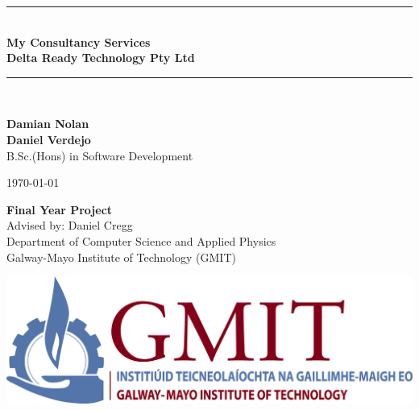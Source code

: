 \documentclass[12pt,a4paper,oneside,openany]{book}
\newcommand{\projecttitle}{My Consultancy Services}
\newcommand{\industrypartner}{Delta Ready Technology Pty Ltd}
\newcommand{\projectauthor}{Damian Nolan \\[0.2cm] Daniel Verdejo}
\newcommand{\projectadvisor}{Daniel Cregg}
\newcommand{\projectprogramme}{B.Sc.(Hons) in Software Development}
\newcommand{\projectdate}{\today}
\begin{document}
  \begin{titlepage}
    \begin{minipage}[t][6cm]{\textwidth}
      \centering
      \rule{\linewidth}{0.5mm} \\[0.4cm]
      { \LARGE \bfseries \projecttitle \\[0.4cm] }
      { \bfseries \industrypartner \\[0.4cm]}
      \rule{\linewidth}{0.5mm} \\[0.8cm]
    \end{minipage}
    
    \begin{minipage}[t][6.5cm]{\textwidth}
      \centering
      \textbf{\projectauthor}\\[0.5cm]
      \projectprogramme
    \end{minipage}
  
    \begin{minipage}[t][1cm]{\textwidth}
      \centering
      \textsc{\projectdate}
    \end{minipage}
      
    \begin{minipage}[t][3cm]{\textwidth}
      \centering
      \textbf{Final Year Project}\\[0.3cm]
      Advised by: \projectadvisor \\[0.1cm]
      Department of Computer Science and Applied Physics\\
      Galway-Mayo Institute of Technology (GMIT)
    \end{minipage}
  
    \begin{center}    
      \includegraphics{img/gmit-logo.jpg}
    \end{center}
  \end{titlepage}
  \setcounter{page}{2}
  \tableofcontents
  
  
  
\end{document}
